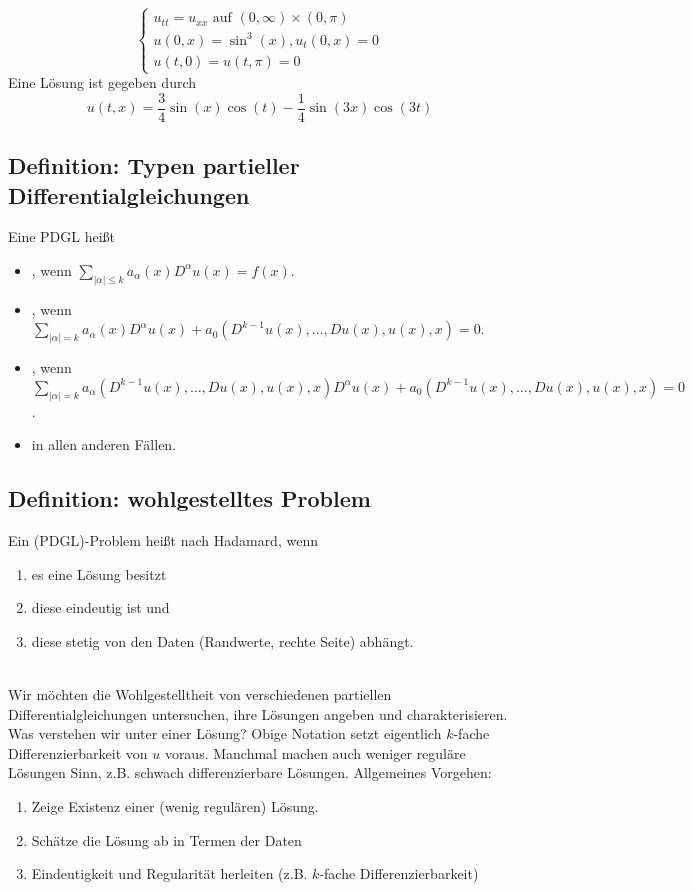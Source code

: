 	\[ \begin{cases}
		u_{tt} = u_{xx} \text{ auf } (0,\infty) \times (0, \pi) \\
		u(0,x) = \sin^3(x), u_t (0,x) = 0 \\
		u(t,0) = u(t,\pi) = 0
		\end{cases} \]
		Eine Lösung ist gegeben durch
		\[ u(t,x) = \frac{3}{4} \sin (x) \cos (t) - \frac{1}{4} \sin (3x) \cos (3t) \]

\subsection{Definition: Typen partieller Differentialgleichungen}
\label{def_pdgl_typen}
	Eine PDGL heißt    
	\begin{itemize}
		\item {}, wenn $\sum\limits_{|\alpha| \leq k} a_\alpha (x) D^\alpha u(x) = f(x)$.
		\item {}, wenn $\sum\limits_{|\alpha| = k} a_\alpha (x) D^\alpha u(x) + a_0(D^{k-1} u(x),\dots,Du(x),u(x),x) = 0$.
		\item {}, wenn $\sum\limits_{|\alpha| = k} a_\alpha(D^{k-1} u(x), \dots, Du(x),u(x),x)D^\alpha u(x) + a_0(D^{k-1}u(x),\dots,Du(x),u(x),x) = 0$.
		\item {} in allen anderen Fällen.
	\end{itemize}
	
\subsection{Definition: wohlgestelltes Problem}
\label{def_wohlgestellt}
	Ein (PDGL)-Problem heißt  nach Hadamard, wenn
	\begin{enumerate}[(1)]
		\item es eine Lösung besitzt
		\item diese eindeutig ist und
		\item diese stetig von den Daten (Randwerte, rechte Seite) abhängt.
	\end{enumerate}
	
\mbox{} \\ Wir möchten die Wohlgestelltheit von verschiedenen partiellen Differentialgleichungen untersuchen, ihre Lösungen angeben und charakterisieren. Was verstehen wir unter einer Lösung? Obige Notation setzt eigentlich $k$-fache Differenzierbarkeit von $u$ voraus. Manchmal machen auch weniger reguläre Lösungen Sinn, z.B. schwach differenzierbare Lösungen. Allgemeines Vorgehen:
\begin{enumerate}[(1)]
	\item Zeige Existenz einer (wenig regulären) Lösung.
	\item Schätze die Lösung ab in Termen der Daten
	\item Eindeutigkeit und Regularität herleiten (z.B. $k$-fache Differenzierbarkeit)
\end{enumerate}
\newpage